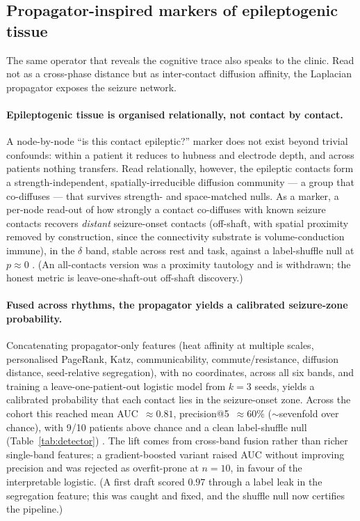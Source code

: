 \documentclass[11pt]{article}
\newcommand{\tab}[1]{Table~\ref{#1}}
\begin{document}
\subsection{Propagator-inspired markers of epileptogenic tissue}

The same operator that reveals the cognitive trace also speaks to the clinic.
Read not as a cross-phase distance but as inter-contact diffusion affinity, the
Laplacian propagator exposes the seizure network.

\paragraph{Epileptogenic tissue is organised relationally, not contact by
contact.}
A node-by-node ``is this contact epileptic?'' marker does not exist beyond
trivial confounds: within a patient it reduces to hubness and electrode depth,
and across patients nothing transfers. Read relationally, however, the
epileptic contacts form a strength-independent, spatially-irreducible diffusion
community --- a group that co-diffuses --- that survives strength- and
space-matched nulls. As a marker, a per-node read-out of how strongly a contact
co-diffuses with known seizure contacts recovers \emph{distant} seizure-onset
contacts (off-shaft, with spatial proximity removed by construction, since the
connectivity substrate is volume-conduction immune), in the $\delta$ band, stable
across rest and task, against a label-shuffle null at $p\approx0$
. (An all-contacts version was a proximity tautology and is withdrawn; the honest
metric is leave-one-shaft-out off-shaft discovery.)

\paragraph{Fused across rhythms, the propagator yields a calibrated seizure-zone
probability.}
Concatenating propagator-only features (heat affinity at multiple scales,
personalised PageRank, Katz, communicability, commute/resistance,
diffusion distance, seed-relative segregation), with no coordinates, across all
six bands, and training a leave-one-patient-out logistic model from $k=3$ seeds,
yields a calibrated probability that each contact lies in the seizure-onset zone.
Across the cohort this reached mean AUC~$\approx0.81$, precision@5~$\approx60\%$
($\sim$sevenfold over chance), with 9/10 patients above chance and a clean
label-shuffle null (\tab{tab:detector})
. The lift comes from cross-band fusion rather than richer single-band features;
a gradient-boosted variant raised AUC without improving precision and was
rejected as overfit-prone at $n=10$, in favour of the interpretable logistic. (A
first draft scored $0.97$ through a label leak in the segregation feature; this
was caught and fixed, and the shuffle null now certifies the pipeline.)
\end{document}
